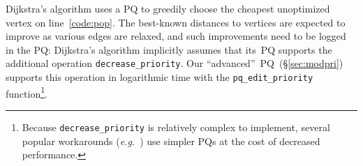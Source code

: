 



Dijkstra's algorithm uses a PQ to greedily choose the
cheapest unoptimized vertex on line~\ref{code:pop}. The
best-known distances to vertices are expected to improve as
various edges are relaxed, and such improvements need to be logged in the PQ:
Dijkstra's algorithm implicitly assumes that its~PQ supports the additional
operation \texttt{decrease\_priority}.
Our ``advanced''~PQ~(\S\ref{sec:modpri})
supports this operation in logarithmic time with the
\texttt{pq\_edit\_priority} function\footnote{Because
\texttt{decrease\_priority} is relatively complex to implement,
several popular
workarounds (\emph{e.g.}~\cite{arthur}) use simpler PQs at the cost
of decreased performance.}.


